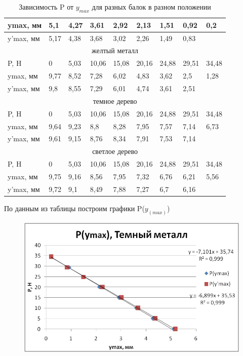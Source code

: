 \documentclass[a4paper,14pt]{extarticle}
\begin{document}
\begin{enumerate}
\begin{table}[!ht]
\begin{tabular}{|l|l|l|l|l|l|l|l|l|}
		ymax, мм & 5,1 & 4,27 & 3,61 & 2,92 & 2,13 & 1,51 & 0,92 & 0,2 \\ \hline
		y'max, мм & 5,17 & 4,38 & 3,68 & 3,02 & 2,26 & 1,49 & 0,83 & ~ \\ \hline
		\multicolumn{9}{|c|}{желтый металл} \\ \hline
		P, H & 0 & 5,03 & 10,06 & 15,08 & 20,16 & 24,88 & 29,51 & 34,48 \\ \hline
		ymax, мм & 9,77 & 8,52 & 7,28 & 6,02 & 4,83 & 3,62 & 2,5 & 1,28 \\ \hline
		y'max, мм & 9,8 & 8,55 & 7,29 & 6,01 & 4,74 & 3,61 & 2,51 & ~ \\ \hline
		\multicolumn{9}{|c|}{темное дерево} \\ \hline
		P, H & 0 & 5,03 & 10,06 & 15,08 & 20,16 & 24,88 & 29,51 & 34,48 \\ \hline
		ymax, мм & 9,64 & 9,23 & 8,8 & 8,28 & 7,95 & 7,57 & 7,14 & 6,73 \\ \hline
		y'max, мм & 9,61 & 9,15 & 8,76 & 8,34 & 7,91 & 7,53 & 7,14 & ~ \\ \hline
		\multicolumn{9}{|c|}{светлое дерево} \\ \hline
		P, H & 0 & 5,03 & 10,06 & 15,08 & 20,16 & 24,88 & 29,51 & 34,48 \\ \hline
		ymax, мм & 9,75 & 9,16 & 8,56 & 7,95 & 7,32 & 6,76 & 6,21 & 5,56 \\ \hline
		y'max, мм & 9,72 & 9,1 & 8,49 & 7,88 & 7,27 & 6,7 & 6,16& ~ \\ \hline
	\end{tabular}
	\caption{Зависимость P от $y_{max}$ для разных балок в разном положении}
\end{table}
По данным из таблицы построим графики P($y_(max)$)
\begin{figure}[H]
	\centering  
		\includegraphics[scale = 0.65]{"1.3.2_1.jpg"}

\end{figure}
\end{enumerate}
\end{document}
